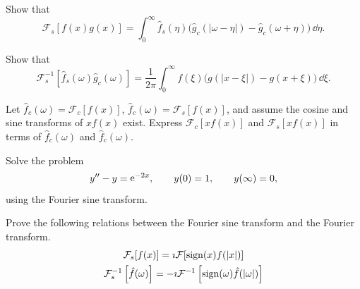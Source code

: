 {%
\begin{Exercise}
  \label{exercise ode ft sine convolution}
  Show that
  \[ \mathcal{F}_s[f(x)g(x)] =
  \int_0^\infty \hat{f}_s(\eta) \big( \hat{g}_c(|\omega-\eta|) 
  - \hat{g}_c(\omega+\eta) \big) \,\dd \eta. \]

\end{Exercise}



\begin{Exercise}
  \label{exercise ode ft inverse sine convolution}
  Show that
  \[ \mathcal{F}_s^{-1}[\hat{f}_s(\omega) \hat{g}_c(\omega)] 
  = \frac{1}{2\pi} \int_0^\infty f(\xi)
  \big( g(|x-\xi|) - g(x+\xi) \big) \,\dd \xi. \]

\end{Exercise}




\begin{Exercise}
  \label{exercise ode ft fc xf(x) fs xf(x)}
  Let $\hat{f}_c(\omega) = \mathcal{F}_c[f(x)]$, $\hat{f}_c(\omega) = \mathcal{F}_s[f(x)]$, 
  and assume the cosine and sine transforms of $x f(x)$ exist.
  Express $\mathcal{F}_c[x f(x)]$ and $\mathcal{F}_s[x f(x)]$ in terms of
  $\hat{f}_c(\omega)$ and $\hat{f}_c(\omega)$. 

\end{Exercise}



\begin{Exercise}
  \label{exercise ode ft y-y=e-2x}
  Solve the problem
  \[ y'' - y = \mathop{\mathrm{e}}\nolimits^{-2 x}, \qquad y(0) = 1, \qquad y(\infty) = 0,\]
  using the Fourier sine transform.

\end{Exercise}




\begin{Exercise}
  \label{exercise ode ft fst ft}
  \label{exer_fsf_ifsf}
  Prove the following relations between the Fourier sine transform and 
  the Fourier transform.
  \begin{gather*}
    \mathcal{F}_s[f(x)] = \imath \mathcal{F}[\mathop{\mathrm{sign}}\nolimits(x) f(|x|)] \\
    \mathcal{F}_s^{-1} \left[ \hat{f}(\omega) \right] 
    = - \imath \mathcal{F}^{-1} \left[ \mathop{\mathrm{sign}}\nolimits(\omega) \hat{f}(|\omega|) \right]
  \end{gather*}


\end{Exercise}}

